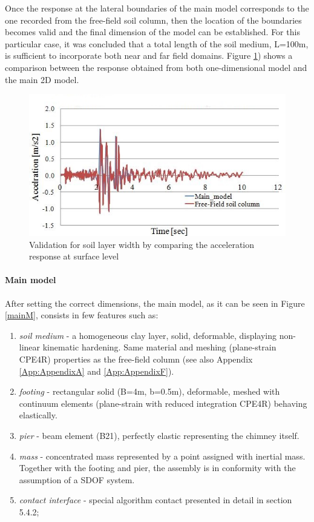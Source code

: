 	Once the response at the lateral boundaries of the main model corresponds to the one recorded from the free-field soil column, then the location of the boundaries becomes valid and the final dimension of the model can be established. For this particular case, it was concluded that a total length of the soil medium, L=100m, is sufficient to incorporate both near and far field domains. Figure \ref{validation}) shows a comparison between the response obtained from both one-dimensional model and the main 2D model.
		\begin{figure}[!h]
			\centering
			\includegraphics[width=0.7\linewidth]{"free-field2"}
			\caption{Validation for soil layer width by comparing the acceleration response at surface level}
			\label{validation}
		\end{figure}			
			
			
	\newpage
	\paragraph{Main model}
	After setting the correct dimensions, the main model, as it can be seen in Figure \ref{mainM}, consists in few features such as:
	\begin{enumerate}
		\item \textit{soil medium} - a homogeneous clay layer, solid, deformable, displaying non-linear kinematic hardening. Same material and meshing (plane-strain CPE4R) properties as the free-field column (see also Appendix \ref{App:AppendixA} and \ref{App:AppendixF}).
		\item \textit{footing} -  rectangular solid (B=4m, b=0.5m), deformable, meshed with continuum elements (plane-strain with reduced integration CPE4R) behaving elastically.
		\item \textit{pier} - beam element (B21), perfectly elastic representing the chimney itself.
		\item \textit{mass} - concentrated mass represented by a point assigned with inertial mass. Together with the footing and pier, the assembly is in conformity with the assumption of a SDOF system.
		\item \textit{contact interface} - special algorithm contact presented in detail in section 5.4.2;
	\end{enumerate}
	
